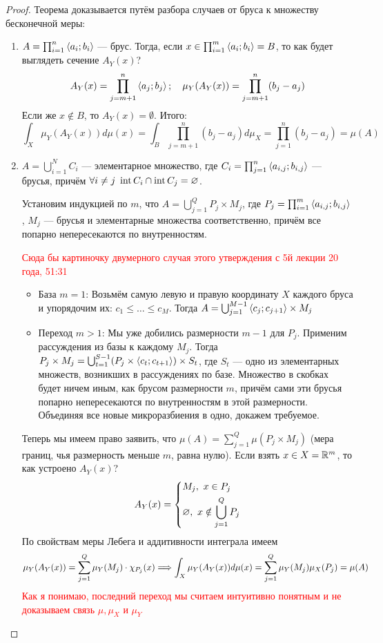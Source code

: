 \begin{proof}
	Теорема доказывается путём разбора случаев от бруса к множеству бесконечной меры:
	\begin{enumerate}
		\item $A = \prod_{i = 1}^n \left\langle a_i; b_i\right\rangle$ --- брус. Тогда, если $x \in \prod_{i = 1}^m \left\langle a_i; b_i\right\rangle = B$, то как будет выглядеть сечение $A_Y(x)$?
		\[
			A_Y(x) = \prod_{j = m + 1}^n \left\langle a_j; b_j\right\rangle;\ \ \ \mu_Y(A_Y(x)) = \prod_{j = m + 1}^n (b_j - a_j)
		\]
		Если же $x \notin B$, то $A_Y(x) = \emptyset$. Итого:
		\[
			\int_X \mu_Y(A_Y(x))d\mu(x) = \int_{B} \prod_{j = m + 1}^n (b_j - a_j)d\mu_X = \prod_{j = 1}^n (b_j - a_j) = \mu(A)
		\]
		
		\item $A = \bigcup_{i = 1}^N C_i$ --- элементарное множество, где $C_i = \prod_{j = 1}^n \left\langle a_{i, j}; b_{i, j}\right\rangle$ --- брусья, причём $\forall i \neq j\ \operatorname{int} C_i \cap \operatorname{int} C_j = \varnothing$.
		
		Установим индукцией по $m$, что $A = \bigcup_{j = 1}^Q P_j \times M_j$, где $P_j = \prod_{i = 1}^m \left\langle a_{i, j}; b_{i, j}\right\rangle$, $M_j$ --- брусья и элементарные множества соответственно, причём все попарно непересекаются по внутренностям.
		
		\textcolor{red}{Сюда бы картиночку двумерного случая этого утверждения с 5й лекции 20 года, 51:31}
		
		\begin{itemize}
			\item База $m = 1$: Возьмём самую левую и правую координату $X$ каждого бруса и упорядочим их: $c_1 \le \ldots \le c_M$. Тогда $A = \bigcup_{j = 1}^{M - 1} \left\langle c_j; c_{j + 1}\right\rangle \times M_j$
			
			\item Переход $m > 1$: Мы уже добились размерности $m - 1$ для $P_j$. Применим рассуждения из базы к каждому $M_j$. Тогда $P_j \times M_j = \bigcup_{t = 1}^{S - 1} (P_j \times \left\langle c_t; c_{t + 1}\right\rangle) \times S_t$, где $S_t$ --- одно из элементарных множеств, возникших в рассуждениях по базе. Множество в скобках будет ничем иным, как брусом размерности $m$, причём сами эти брусья попарно непересекаются по внутренностям в этой размерности. Объединяя все новые микроразбиения в одно, докажем требуемое.
		\end{itemize}
		Теперь мы имеем право заявить, что $\mu(A) = \sum_{j = 1}^Q \mu(P_j \times M_j)$ (мера границ, чья размерность меньше $m$, равна нулю). Если взять $x \in X = \mathbb{R}^m$, то как устроено $A_Y(x)$?
		\[
			A_Y(x) = \left\{ \begin{aligned} 
				&{M_j,\ x \in P_j}
				\\
				&{\varnothing,\ x \notin \bigcup_{j = 1}^Q P_j}
			 \end{aligned} \right.
		\]
		По свойствам меры Лебега и аддитивности интеграла имеем
		\[
			\mu_Y(A_Y(x)) = \sum_{j = 1}^Q \mu_Y(M_j) \cdot \chi_{P_j}(x) \Longrightarrow \int_X \mu_Y(A_Y(x)) d\mu(x) = \sum_{j = 1}^Q \mu_Y(M_j) \mu_X(P_j) = \mu(A)
		\]
		\textcolor{red}{Как я понимаю, последний переход мы считаем интуитивно понятным и не доказываем связь $\mu, \mu_X$ и $\mu_Y$}
		

\end{enumerate}
\end{proof}
